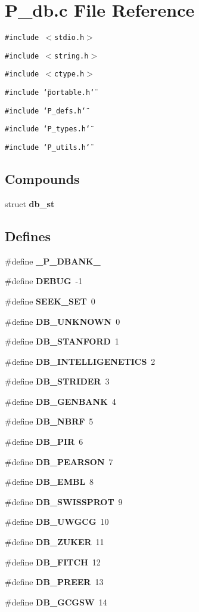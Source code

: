 \section{P\_\-db.c File Reference}
\label{P__db_8c}
{\tt \#include $<$stdio.h$>$}\par
{\tt \#include $<$string.h$>$}\par
{\tt \#include $<$ctype.h$>$}\par
{\tt \#include \char`\"{}portable.h\char`\"{}}\par
{\tt \#include \char`\"{}P\_\-defs.h\char`\"{}}\par
{\tt \#include \char`\"{}P\_\-types.h\char`\"{}}\par
{\tt \#include \char`\"{}P\_\-utils.h\char`\"{}}\par
\subsection*{Compounds}
\begin{CompactItemize}
\item 
struct {\bf db\_\-st}
\end{CompactItemize}
\subsection*{Defines}
\begin{CompactItemize}
\item 
\#define {\bf \_\-P\_\-DBANK\_\-}
\item 
\#define {\bf DEBUG}\ -1
\item 
\#define {\bf SEEK\_\-SET}\ 0
\item 
\#define {\bf DB\_\-UNKNOWN}\ 0
\item 
\#define {\bf DB\_\-STANFORD}\ 1
\item 
\#define {\bf DB\_\-INTELLIGENETICS}\ 2
\item 
\#define {\bf DB\_\-STRIDER}\ 3
\item 
\#define {\bf DB\_\-GENBANK}\ 4
\item 
\#define {\bf DB\_\-NBRF}\ 5
\item 
\#define {\bf DB\_\-PIR}\ 6
\item 
\#define {\bf DB\_\-PEARSON}\ 7
\item 
\#define {\bf DB\_\-EMBL}\ 8
\item 
\#define {\bf DB\_\-SWISSPROT}\ 9
\item 
\#define {\bf DB\_\-UWGCG}\ 10
\item 
\#define {\bf DB\_\-ZUKER}\ 11
\item 
\#define {\bf DB\_\-FITCH}\ 12
\item 
\#define {\bf DB\_\-PREER}\ 13
\item 
\#define {\bf DB\_\-GCGSW}\ 14
\end{CompactItemize}
